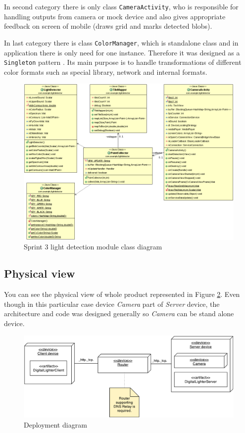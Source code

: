 In second category there is only class \texttt{CameraActivity}, who is responsible for handling outputs from camera or mock device and also gives appropriate feedback on screen of mobile (draws grid and marks detected blobs).

In last category there is class \texttt{ColorManager}, which is standalone class and in application there is only need for one instance. Therefore it was designed as a \texttt{Singleton} pattern \cite[p.~144]{Gamma:1995:DPE:186897}. Its main purpose is to handle transformations of different color formats such as special library, network and internal formats.

\begin{figure}[H]
	\centering
		\includegraphics[width=16.2cm]{sprint3/sprint3.png}
	\caption{Sprint 3 light detection module class diagram}
	\label{fig:class_diagram_sprint3}
\end{figure}

\subsection{Physical view}
You can see the physical view of whole product represented in Figure \ref{fig:sprint3_deployment_diagram}.
Even though in this particular case device \emph{Camera} part of \emph{Server} device, the architecture and code was designed generally so \emph{Camera} can be stand alone device.

\begin{figure}[H]
	\centering
		\includegraphics[width=15cm]{images/deployment-diagram-sprint3}
	\caption{Deployment diagram}
	\label{fig:sprint3_deployment_diagram}
\end{figure}

